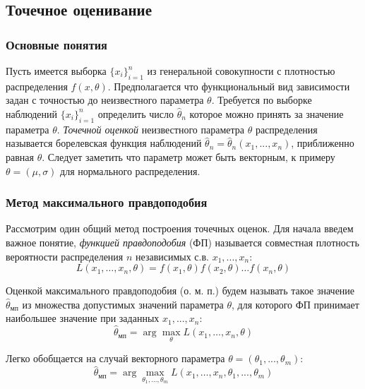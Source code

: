 \documentclass[12pt,a4paper]{article}
\begin{document}
\subsection{Точечное оценивание}
\subsubsection{Основные понятия}
Пусть имеется выборка $\{x_i\}_{i=1}^n$ из генеральной совокупности с плотностью распределения $f(x,\theta)$. Предполагается что функциональный вид зависимости задан с точностью до неизвестного параметра $\theta$. Требуется по выборке наблюдений $\{x_i\}_{i=1}^n$ определить число $\widehat{\theta}_n$ которое можно принять за значение параметра $\theta$. \textit{Точечной оценкой} неизвестного параметра $\theta$ распределения называется борелевская функция наблюдений $\widehat{\theta}_n = \widehat{\theta}_n(x_1, ..., x_n)$, приближенно равная $\theta$. Следует заметить что параметр может быть векторным, к примеру $\theta = (\mu, \sigma)$ для нормального распределения.

\subsubsection{Метод максимального правдоподобия}
Рассмотрим один общий метод построения точечных оценок. Для начала введем важное понятие, \textit{функцией правдоподобия} (ФП) называется совместная плотность вероятности распределения $n$ независимых с.в. $x_1, ..., x_n$:
\begin{equation}
	L\left(x_{1}, \ldots, x_{n}, \theta\right)=f\left(x_{1}, \theta\right) f\left(x_{2}, \theta\right) \ldots f\left(x_{n}, \theta\right)
\end{equation}

Оценкой максимального правдоподобия (о. м. п.) будем называть такое значение $\widehat{\theta}_{\text{мп}}$ из множества допустимых значений параметра $\theta$, для которого ФП принимает наибольшее значение при заданных $x_1, ..., x_n$:
\begin{equation}
	\widehat{\theta}_{\text{мп}}=\arg \max _{\theta} L\left(x_{1}, \ldots, x_{n}, \theta\right)
\end{equation}

Легко обобщается на случай векторного параметра $\theta = (\theta_1, ..., \theta_m)$:
\begin{equation}
	\widehat{\theta}_{\text{мп}}=\arg \max _{\theta_1, ..., \theta_m} L\left(x_{1}, \ldots, x_{n}, \theta_1, ..., \theta_m\right)
\end{equation}
\end{document}
